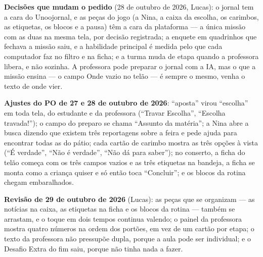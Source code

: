 \textbf{Decisões que mudam o pedido} (28 de outubro de 2026, Lucas): o jornal
tem a cara do Unoojornal, e as peças do jogo (a Nina, a caixa da escolha, os
carimbos, as etiquetas, os blocos e a pausa) têm a cara da plataforma --- a
única missão com as duas na mesma tela, por decisão registrada; a enquete em
quadrinhos que fechava a missão saiu, e a habilidade principal é medida pelo
que cada computador faz no filtro e na ficha; e a turma muda de etapa quando a
professora libera, e não sozinha. A professora pode preparar o jornal com a
IA, mas o que a missão ensina --- o campo Onde vazio no telão --- é sempre o
mesmo, venha o texto de onde vier.

\textbf{Ajustes do PO de 27 e 28 de outubro de 2026}: \enquote{aposta} virou
\enquote{escolha} em toda tela, do estudante e da professora (\enquote{Travar
Escolha}, \enquote{Escolha travada!}); o campo do preparo se chama
\enquote{Assunto da matéria}; a Nina abre a busca dizendo que existem três
reportagens sobre a feira e pede ajuda para encontrar todas as do pátio; cada
cartão de carimbo mostra as três opções à vista (\enquote{É verdade},
\enquote{Não é verdade}, \enquote{Não dá para saber}); no conserto, a ficha
do telão começa com os três campos vazios e as três etiquetas na bandeja, a
ficha se monta como a criança quiser e só então toca \enquote{Concluir}; e os
blocos da rotina chegam embaralhados.

\textbf{Revisão de 29 de outubro de 2026} (Lucas): as peças que se organizam
--- as notícias na caixa, as etiquetas na ficha e os blocos da rotina ---
também se arrastam, e o toque em dois tempos continua valendo; o painel da
professora mostra quatro números na ordem dos portões, em vez de um cartão por
etapa; o texto da professora não pressupõe dupla, porque a aula pode ser
individual; e o Desafio Extra do fim saiu, porque não tinha nada a fazer.

